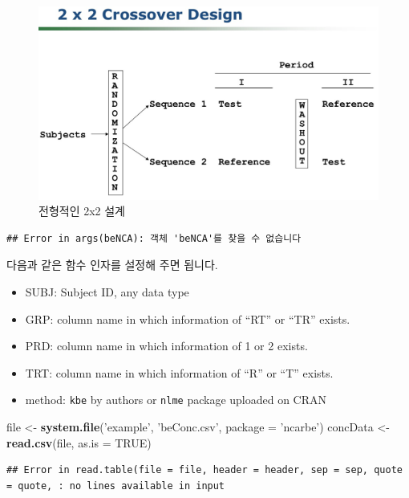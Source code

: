 \documentclass[12pt,]{krantz}
\newenvironment{Shaded}{\begin{snugshade}}{\end{snugshade}}
\newcommand{\KeywordTok}[1]{\textcolor[rgb]{0.13,0.29,0.53}{\textbf{#1}}}
\newcommand{\DataTypeTok}[1]{\textcolor[rgb]{0.13,0.29,0.53}{#1}}
\newcommand{\StringTok}[1]{\textcolor[rgb]{0.31,0.60,0.02}{#1}}
\newcommand{\OtherTok}[1]{\textcolor[rgb]{0.56,0.35,0.01}{#1}}
\newcommand{\NormalTok}[1]{#1}
\providecommand{\tightlist}{%
  \setlength{\itemsep}{0pt}\setlength{\parskip}{0pt}}
\theoremstyle{definition}
\theoremstyle{definition}
\theoremstyle{definition}
\theoremstyle{remark}
\begin{document}
\begin{figure}
\includegraphics[width=18.01in]{assets/twobytwo} \caption{전형적인 2x2 설계}\label{fig:twobytwo}
\end{figure}

\begin{verbatim}
## Error in args(beNCA): 객체 'beNCA'를 찾을 수 없습니다
\end{verbatim}

다음과 같은 함수 인자를 설정해 주면 됩니다.

\begin{itemize}
\tightlist
\item
  SUBJ: Subject ID, any data type
\item
  GRP: column name in which information of ``RT'' or ``TR'' exists.
\item
  PRD: column name in which information of 1 or 2 exists.
\item
  TRT: column name in which information of ``R'' or ``T'' exists.
\item
  method: \texttt{kbe} by authors or \texttt{nlme} package uploaded on
  CRAN
\end{itemize}

\begin{Shaded}
\begin{Highlighting}[]
\NormalTok{file <-}\StringTok{ }\KeywordTok{system.file}\NormalTok{(}\StringTok{'example'}\NormalTok{, }\StringTok{'beConc.csv'}\NormalTok{, }\DataTypeTok{package =} \StringTok{'ncarbe'}\NormalTok{)}
\NormalTok{concData <-}\StringTok{ }\KeywordTok{read.csv}\NormalTok{(file, }\DataTypeTok{as.is =} \OtherTok{TRUE}\NormalTok{)}
\end{Highlighting}
\end{Shaded}

\begin{verbatim}
## Error in read.table(file = file, header = header, sep = sep, quote = quote, : no lines available in input
\end{verbatim}
\end{document}
